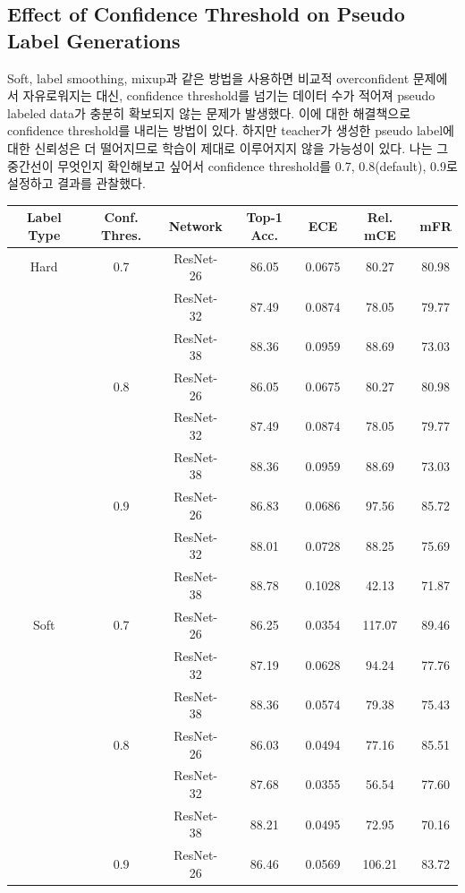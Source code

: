 \documentclass[a4paper, 10pt]{article}
\begin{document}
\subsection{Effect of Confidence Threshold on Pseudo Label Generations}
Soft, label smoothing, mixup과 같은 방법을 사용하면 비교적 overconfident
문제에서 자유로워지는 대신, confidence threshold를 넘기는 데이터 수가 적어져
pseudo labeled data가 충분히 확보되지 않는 문제가 발생했다. 이에 대한 해결책으로
confidence threshold를 내리는 방법이 있다. 하지만 teacher가 생성한 pseudo
label에 대한 신뢰성은 더 떨어지므로 학습이 제대로 이루어지지 않을 가능성이 있다.
나는 그 중간선이 무엇인지 확인해보고 싶어서 confidence threshold를 0.7,
0.8(default), 0.9로 설정하고 결과를 관찰했다.
\begin{table}[!h]
  \center 
  \begin{tabular}{|c|c|c|c|c|c|c|}
    \hline
    Label Type & Conf. Thres. & Network & Top-1 Acc. & ECE & Rel. mCE & mFR \\ \hline
    Hard & 0.7 & ResNet-26 & 86.05 & 0.0675 & 80.27 & 80.98 \\
     &  & ResNet-32 & 87.49 & 0.0874 & 78.05 & 79.77 \\
     &  & ResNet-38 & 88.36 & 0.0959 & 88.69 & 73.03 \\ \hhline{|~|-|-|-|-|-|-|}
     & 0.8 & ResNet-26 & 86.05 & 0.0675 & 80.27 & 80.98 \\
     &  & ResNet-32 & 87.49 & 0.0874 & 78.05 & 79.77 \\
     &  & ResNet-38 & 88.36 & 0.0959 & 88.69 & 73.03 \\ \hhline{|~|-|-|-|-|-|-|}
     & 0.9 & ResNet-26 & 86.83 & 0.0686 & 97.56 & 85.72 \\
     &  & ResNet-32 & 88.01 & 0.0728 & 88.25 & 75.69 \\
     &  & ResNet-38 & 88.78 & 0.1028 & 42.13 & 71.87 \\ \hline
    Soft & 0.7 & ResNet-26 & 86.25 & 0.0354 & 117.07 & 89.46 \\
     &  & ResNet-32 & 87.19 & 0.0628 & 94.24 & 77.76 \\
     &  & ResNet-38 & 88.36 & 0.0574 & 79.38 & 75.43 \\ \hhline{|~|-|-|-|-|-|-|}
     & 0.8 & ResNet-26 & 86.03 & 0.0494 & 77.16 & 85.51 \\
     &  & ResNet-32 & 87.68 & 0.0355 & 56.54 & 77.60 \\
     &  & ResNet-38 & 88.21 & 0.0495 & 72.95 & 70.16 \\ \hhline{|~|-|-|-|-|-|-|}
     & 0.9 & ResNet-26 & 86.46 & 0.0569 & 106.21 & 83.72 \\

\end{tabular}
\end{table}
\end{document}
